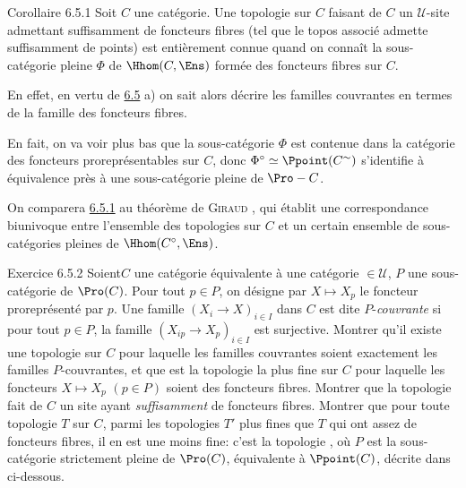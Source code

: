 \documentclass[10pt]{../fichiers-configuration-latex/smfart}
\begin{document}
\begin{enonce*}{Corollaire 6.5.1}
Soit $C$ une catégorie. Une topologie sur $C$ faisant de $C$ un
$𝒰$-site admettant suffisamment de foncteurs fibres (\ie tel
que le topos associé admette suffisamment de points) est entièrement
connue quand on connaît la sous-catégorie pleine $\Phi$ de
$\Hhom(C,\Ens)$ formée des foncteurs fibres sur $C$.
\end{enonce*}

En effet, en vertu de \hyperref[IV.prop6.5]{6.5} a) on sait alors décrire les
familles couvrantes en termes de la famille des foncteurs fibres.

En fait, on va voir plus bas  que la sous-catégorie
$\Phi$ est contenue dans la catégorie des foncteurs
proreprésentables sur $C$, donc $\Phi^{\circ}\simeq
\Ppoint(C^{\sim})$ s'identifie à équivalence près à une
sous-catégorie pleine de $\Pro-C$.

On comparera \hyperref[IV.cor6.5.1]{6.5.1} au théorème de \textsc{Giraud}
, qui établit une correspondance biunivoque entre
l'ensemble des topologies sur $C$ et un certain ensemble de
sous-catégories pleines de $\Hhom(C^{\circ},\Ens)$.

\begin{enonce*}[remark]{Exercice 6.5.2}
Soient\pageoriginale $C$ une catégorie équivalente à une catégorie
$\in 𝒰$, $P$ une sous-catégorie de $\Pro(C)$. Pour tout
$p\in P$, on désigne par $X\mapsto X_p$ le foncteur proreprésenté
par $p$. Une famille $(X_i\rightarrow X)_{i\in I}$ dans $C$ est dite
$P$-\emph{couvrante} si pour tout $p\in P$, la famille
$(X_{ip}\rightarrow X_p)_{i\in I}$ est surjective. Montrer qu'il
existe une topologie  sur $C$ pour laquelle les familles
couvrantes soient exactement les familles $P$-couvrantes, et que
 est la topologie la plus fine sur $C$ pour laquelle les
foncteurs $X\mapsto X_p$ $(p\in P)$ soient des foncteurs fibres.
Montrer que la topologie  fait de $C$ un site ayant
\emph{suffisamment} de foncteurs fibres. Montrer que pour toute
topologie $T$ sur $C$, parmi les topologies $T'$ plus fines que $T$
qui ont assez de foncteurs fibres, il en est une moins fine: c'est
la topologie , où $P$ est la sous-catégorie strictement pleine
de $\Pro(C)$, équivalente à $\Ppoint(C)$, décrite dans
ci-dessous.
\end{enonce*}
\end{document}
